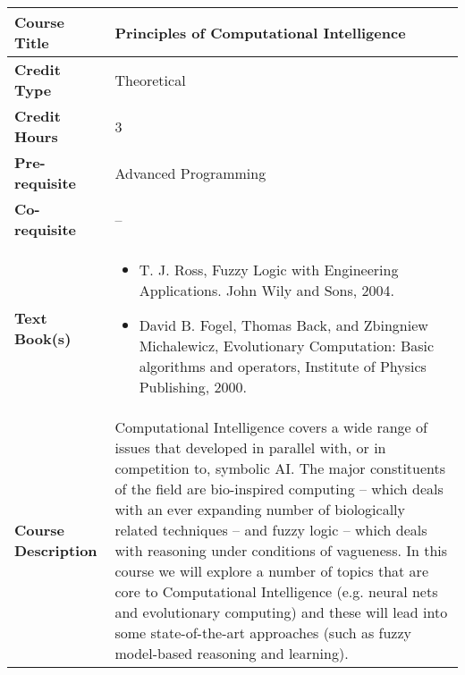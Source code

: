 \documentclass[11pt]{article}
\begin{document}
\begin{table}[h!]
\begin{tabular}{|l|l|}
\hline
\textbf{Course Title}       &  Principles of Computational Intelligence \\ \hline
\textbf{Credit Type}        &   Theoretical \\ \hline
\textbf{Credit Hours}       & 3 \\ \hline
\textbf{Pre-requisite}       &  Advanced Programming \\ \hline
\textbf{Co-requisite}       & -- \\ \hline
\textbf{Text Book(s)}       & \begin{minipage}{.70\textwidth}
\begin{itemize} \itemsep-0.4em
	\vspace{3mm}
	\item T. J. Ross, Fuzzy Logic with Engineering Applications. John Wily and Sons, 2004.
	\item David B. Fogel, Thomas Back, and Zbingniew Michalewicz, Evolutionary Computation: Basic algorithms and operators, Institute of Physics Publishing, 2000.
	\vspace{3mm}
\end{itemize}
\end{minipage}\\ \hline
\textbf{Course Description} & \begin{minipage}{.70\textwidth}
\vspace{3mm}
Computational Intelligence covers a wide range of issues that developed in parallel with, or in competition to, symbolic AI. The major constituents of the field are bio-inspired computing – which deals with an ever expanding number of biologically related techniques – and fuzzy logic – which deals with reasoning under conditions of vagueness. In this course we will explore a number of topics that are core to Computational Intelligence (e.g. neural nets and evolutionary computing) and these will lead into some state-of-the-art approaches (such as fuzzy model-based reasoning and learning).
\vspace{3mm}
\end{minipage} \\ \hline
\end{tabular}
\end{table}
\end{document}
